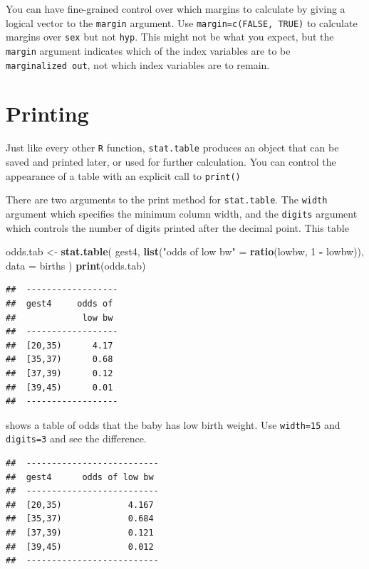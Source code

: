 \documentclass[
]{book}
\newenvironment{Shaded}{\begin{snugshade}}{\end{snugshade}}
\newcommand{\AttributeTok}[1]{\textcolor[rgb]{0.13,0.29,0.53}{#1}}
\newcommand{\DecValTok}[1]{\textcolor[rgb]{0.00,0.00,0.81}{#1}}
\newcommand{\FunctionTok}[1]{\textcolor[rgb]{0.13,0.29,0.53}{\textbf{#1}}}
\newcommand{\NormalTok}[1]{#1}
\newcommand{\OtherTok}[1]{\textcolor[rgb]{0.56,0.35,0.01}{#1}}
\newcommand{\SpecialCharTok}[1]{\textcolor[rgb]{0.81,0.36,0.00}{\textbf{#1}}}
\newcommand{\StringTok}[1]{\textcolor[rgb]{0.31,0.60,0.02}{#1}}
\begin{document}
You can have fine-grained control over which margins to calculate by
giving a logical vector to the \texttt{margin} argument. Use \texttt{margin=c(FALSE,\ TRUE)}
to calculate margins over \texttt{sex} but not
\texttt{hyp}. This might not be what you expect, but the \texttt{margin}
argument indicates which of the index variables are to be \texttt{marginalized\ out},
not which index variables are to remain.

\section{Printing}\label{printing}

Just like every other \texttt{R} function, \texttt{stat.table} produces
an object that can be saved and printed later, or used for further
calculation. You can control the appearance of a table with an explicit
call to \texttt{print()}

There are two arguments to the print method for \texttt{stat.table}. The
\texttt{width} argument which specifies the minimum column width, and the
\texttt{digits} argument which controls
the number of digits printed after the decimal point. This table

\begin{Shaded}
\begin{Highlighting}[]
\NormalTok{odds.tab }\OtherTok{\textless{}{-}} 
  \FunctionTok{stat.table}\NormalTok{(}
\NormalTok{    gest4, }
    \FunctionTok{list}\NormalTok{(}\StringTok{"odds of low bw"} \OtherTok{=} \FunctionTok{ratio}\NormalTok{(lowbw, }\DecValTok{1} \SpecialCharTok{{-}}\NormalTok{ lowbw)),}
    \AttributeTok{data =}\NormalTok{ births}
\NormalTok{)}
\FunctionTok{print}\NormalTok{(odds.tab)}
\end{Highlighting}
\end{Shaded}

\begin{verbatim}
##  ------------------ 
##  gest4     odds of  
##             low bw  
##  ------------------ 
##  [20,35)      4.17  
##  [35,37)      0.68  
##  [37,39)      0.12  
##  [39,45)      0.01  
##  ------------------
\end{verbatim}

shows a table of odds that the baby has low birth weight. Use
\texttt{width=15} and \texttt{digits=3} and see the difference.

\begin{verbatim}
##  -------------------------- 
##  gest4      odds of low bw  
##  -------------------------- 
##  [20,35)             4.167  
##  [35,37)             0.684  
##  [37,39)             0.121  
##  [39,45)             0.012  
##  --------------------------
\end{verbatim}
\end{document}
